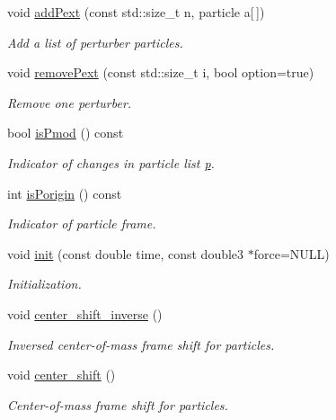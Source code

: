 \begin{DoxyCompactItemize}
void \hyperlink{classARC_1_1chain_a71c8d6ac1e58694b8207aabc7266110f}{add\+Pext} (const std\+::size\+\_\+t n, particle a\mbox{[}$\,$\mbox{]})
\begin{DoxyCompactList}\small\item\em Add a list of perturber particles. \end{DoxyCompactList}\item 
void \hyperlink{classARC_1_1chain_ae7d38ba85ba25ec0d7f6e4463a46afba}{remove\+Pext} (const std\+::size\+\_\+t i, bool option=true)
\begin{DoxyCompactList}\small\item\em Remove one perturber. \end{DoxyCompactList}\item 
bool \hyperlink{classARC_1_1chain_a9ed7067050141069bc98dccf8f7ab9d0}{is\+Pmod} () const
\begin{DoxyCompactList}\small\item\em Indicator of changes in particle list \hyperlink{classARC_1_1chain_af1793b656e139e1f87c2e0a55f87514b}{p}. \end{DoxyCompactList}\item 
int \hyperlink{classARC_1_1chain_afd0342ec9b20a318d811f3ec0f6c9950}{is\+Porigin} () const
\begin{DoxyCompactList}\small\item\em Indicator of particle frame. \end{DoxyCompactList}\item 
void \hyperlink{classARC_1_1chain_aa016cf633d19079dca24565b80a36a3f}{init} (const double time, const double3 $\ast$force=N\+U\+LL)
\begin{DoxyCompactList}\small\item\em Initialization. \end{DoxyCompactList}\item 
void \hyperlink{classARC_1_1chain_a52edc1843550578f5be5590b7403ef97}{center\+\_\+shift\+\_\+inverse} ()
\begin{DoxyCompactList}\small\item\em Inversed center-\/of-\/mass frame shift for particles. \end{DoxyCompactList}\item 
void \hyperlink{classARC_1_1chain_a68ae268afb418455bfdd6e8101b3b4eb}{center\+\_\+shift} ()
\begin{DoxyCompactList}\small\item\em Center-\/of-\/mass frame shift for particles. \end{DoxyCompactList}\item 

\end{DoxyCompactItemize}
